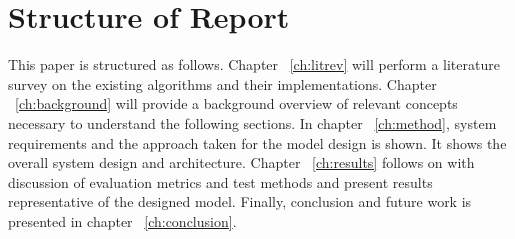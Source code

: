 %
%


\section{Structure of Report}
This paper is structured as follows. Chapter ~\ref{ch:litrev} will perform a
literature survey on the existing algorithms and their implementations. Chapter
~\ref{ch:background}  will provide a background overview of relevant concepts
necessary to understand the following sections. In chapter ~\ref{ch:method},
system requirements and the approach taken for the model design is shown. It
shows the overall system design and architecture.  Chapter ~\ref{ch:results}
follows on with discussion of evaluation metrics and test methods and present
results representative of the designed model. Finally, conclusion and future
work is presented in chapter ~\ref{ch:conclusion}. 



